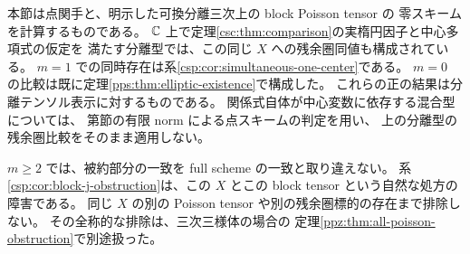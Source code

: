 \begin{remark}[可換 Ku 比較と点スキーム比較の適用範囲]
\label{csp:rem:scope}
本節は点関手と、明示した可換分離三次上の block Poisson tensor の
零スキームを計算するものである。
$\mathbb C$ 上で定理\ref{csc:thm:comparison}の実楕円因子と中心多項式の仮定を
満たす分離型では、この同じ $X$ への残余圏同値も構成されている。
$m=1$ での同時存在は系\ref{csp:cor:simultaneous-one-center}である。
$m=0$ の比較は既に定理\ref{pps:thm:elliptic-existence}で構成した。
これらの正の結果は分離テンソル表示に対するものである。
関係式自体が中心変数に依存する混合型については、
第節の有限 norm による点スキームの判定を用い、
上の分離型の残余圏比較をそのまま適用しない。

$m\ge2$ では、被約部分の一致を full scheme の一致と取り違えない。
系\ref{csp:cor:block-j-obstruction}は、この $X$ とこの block tensor
という自然な処方の障害である。
同じ $X$ の別の Poisson tensor や別の残余圏標的の存在まで排除しない。
その全称的な排除は、三次三様体の場合の
定理\ref{ppz:thm:all-poisson-obstruction}で別途扱った。
\end{remark}
